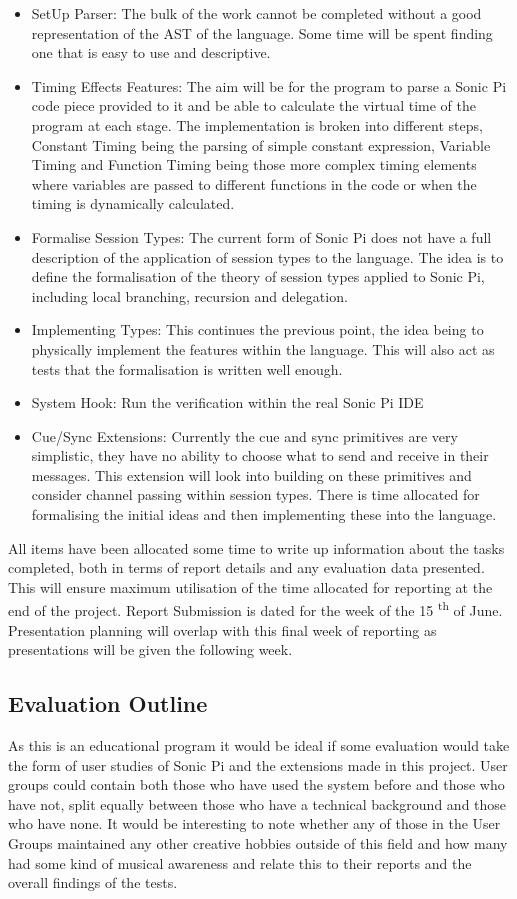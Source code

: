 \documentclass[11pt]{scrartcl}
\begin{document}
\begin{itemize}
	\item SetUp Parser: The bulk of the work cannot be completed without a good 
	representation of the AST of the language. Some time will be spent finding 
	one that is easy to use and descriptive.
	\item Timing Effects Features: The aim will be for the program to parse a 
	Sonic Pi code piece provided to it and be able to calculate the virtual time 
	of the program at each stage. The implementation is broken into different 
	steps, Constant Timing being the parsing of simple constant expression, 
	Variable Timing and Function Timing being those more complex timing elements 
	where variables are passed to different functions in the code or when the 
	timing is dynamically calculated.
	\item Formalise Session Types: The current form of Sonic Pi does not have a 
	full description of the application of session types to the language. The
	idea is to define the formalisation of the theory of session types applied
	to Sonic Pi, including local branching, recursion and delegation.
	\item Implementing Types: This continues the previous point, the idea being 
	to physically implement the features within the language. This will also act 
	as tests that the formalisation is written well enough.
	\item System Hook: Run the verification within the real Sonic Pi IDE
	\item Cue/Sync Extensions: Currently the cue and sync primitives are very 
	simplistic, they have no ability to choose what to send and receive in their 
	messages. This extension will look into building on these primitives and 
	consider channel passing within session types. There is time allocated for 
	formalising the initial ideas and then implementing these into the language.
\end{itemize}

All items have been allocated some time to write up information about the tasks 
completed, both in terms of report details and any evaluation data presented. 
This will ensure maximum utilisation of the time allocated for reporting at the 
end of the project. Report Submission is dated for the week of the 15
\textsuperscript{th} of June. Presentation planning will overlap with this final 
week of reporting as presentations will be given the following week.

\subsection{Evaluation Outline}
As this is an educational program it would be ideal if some evaluation would 
take the form of user studies of Sonic Pi and the extensions made in this 
project. User groups could contain both those who have used the system before 
and those who have not, split equally between those who have a technical 
background and those who have none. It would be interesting to note whether 
any of those in the User Groups maintained any other creative hobbies outside 
of this field and how many had some kind of musical awareness and relate this 
to their reports and the overall findings of the tests.
\end{document}
